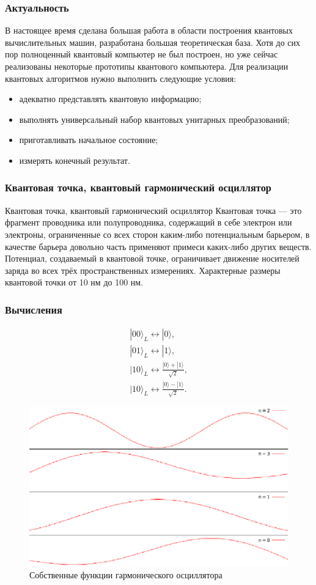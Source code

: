 \documentclass{beamer}
\begin{document}
\begin{frame}
 \frametitle{Актуальность}
В настоящее время сделана большая работа в области построения квантовых вычислительных машин, разработана большая теоретическая база. Хотя до сих пор полноценный квантовый компьютер не был построен, но уже сейчас реализованы некоторые прототипы квантового компьютера. Для реализации квантовых алгоритмов нужно выполнить следующие условия:
  
\begin{itemize}
  \item адекватно представлять квантовую информацию; 
 
  \item выполнять универсальный набор квантовых унитарных преобразований;

  \item приготавливать начальное состояние;
  
  \item измерять конечный результат.
\end{itemize}

\end{frame}
\begin{frame}
\frametitle{Квантовая точка, квантовый гармонический осциллятор}
\begin{block}{Квантовая точка, квантовый гармонический осциллятор}
Квантовая точка --- это фрагмент проводника или полупроводника, содержащий в себе электрон или электроны, ограниченные со всех сторон каким-либо потенциальным барьером, в качестве барьера довольно часть применяют примеси каких-либо других веществ. Потенциал, создаваемый в квантовой точке,
ограничивает движение носителей заряда во всех трёх пространственных измерениях. Характерные размеры квантовой точки от 10 нм до 100 нм.
\end{block}
\end{frame}
\begin{frame}
\frametitle{Вычисления}
\begin{eqnarray}
|00\rangle_{L} \longleftrightarrow |0\rangle,   \\
|01\rangle_{L} \longleftrightarrow |1\rangle,\\
|10\rangle_{L} \longleftrightarrow \frac{|0\rangle + |1\rangle}{\sqrt{2}} \label{plus-position},\\
|10\rangle_{L} \longleftrightarrow \frac{|0\rangle - |1\rangle}{\sqrt{2}} \label{minus-position}.
\end{eqnarray}
\begin{figure}[h]
\centering\includegraphics[width=.50\textwidth]{images/function.eps}
\caption{Собственные функции гармонического осциллятора}\label{ris:kk1}
\end{figure}

\end{frame}
\end{document}
